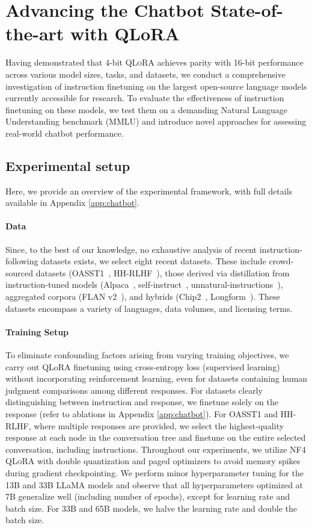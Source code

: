 \section{Advancing the Chatbot State-of-the-art with QLoRA}
\label{sec:pushing}
Having demonstrated that 4-bit \textsc{QLoRA} achieves parity with 16-bit performance across various model sizes, tasks, and datasets, we conduct a comprehensive investigation of instruction finetuning on the largest open-source language models currently accessible for research. To evaluate the effectiveness of instruction finetuning on these models, we test them on a demanding Natural Language Understanding benchmark (MMLU) and introduce novel approaches for assessing real-world chatbot performance.

\subsection{Experimental setup} Here, we provide an overview of the experimental framework, with full details available in Appendix \ref{app:chatbot}.

\paragraph{Data} Since, to the best of our knowledge, no exhaustive analysis of recent instruction-following datasets exists, we select eight recent datasets. These include crowd-sourced datasets (OASST1~\citep{kopf2023openassistant}, HH-RLHF~\citep{bai2022training}), those derived via distillation from instruction-tuned models (Alpaca~\citep{alpaca}, self-instruct~\citep{wang2022self}, unnatural-instructions~\citep{honovich2022unnatural}), aggregated corpora (FLAN v2~\citep{chung2022scaling}), and hybrids (Chip2~\citep{laion2023}, Longform~\citep{koksal2023longform}). These datasets encompass a variety of languages, data volumes, and licensing terms.

\paragraph{Training Setup} To eliminate confounding factors arising from varying training objectives, we carry out QLoRA finetuning using cross-entropy loss (supervised learning) without incorporating reinforcement learning, even for datasets containing human judgment comparisons among different responses. For datasets clearly distinguishing between instruction and response, we finetune solely on the response (refer to ablations in Appendix \ref{app:chatbot}). For OASST1 and HH-RLHF, where multiple responses are provided, we select the highest-quality response at each node in the conversation tree and finetune on the entire selected conversation, including instructions. Throughout our experiments, we utilize NF4 \textsc{QLoRA} with double quantization and paged optimizers to avoid memory spikes during gradient checkpointing. We perform minor hyperparameter tuning for the 13B and 33B LLaMA models and observe that all hyperparameters optimized at 7B generalize well (including number of epochs), except for learning rate and batch size. For 33B and 65B models, we halve the learning rate and double the batch size.

